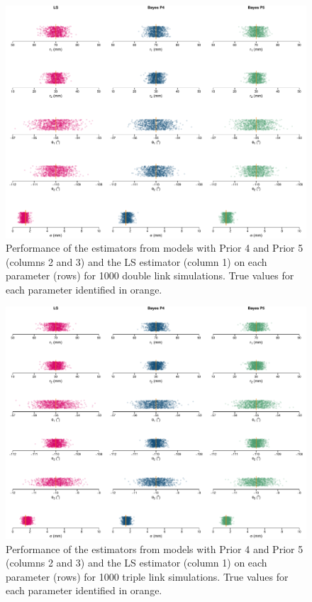\documentclass{article}
\begin{document}
\begin{figure}
	\centering
	\includegraphics[width=\textwidth]{./Figures/DoubleLink_StripChartP4P5.pdf}
	\caption{Performance of the estimators from models with Prior 4 and Prior 5 (columns 2 and 3) and the LS estimator (column 1) on each parameter (rows) for 1000 double link simulations.  True values for each parameter identified in orange.}
	\label{fig:StripChart_DoubleLink_P4P5}
\end{figure}

\begin{figure}
	\centering
	\includegraphics[width=\textwidth]{./Figures/TripleLink_StripChartP4P5.pdf}
	\caption{Performance of the estimators from models with Prior 4 and Prior 5 (columns 2 and 3) and the LS estimator (column 1) on each parameter (rows) for 1000 triple link simulations.  True values for each parameter identified in orange.}
	\label{fig:StripChart_TripleLink_P4P5}
\end{figure}
\end{document}
